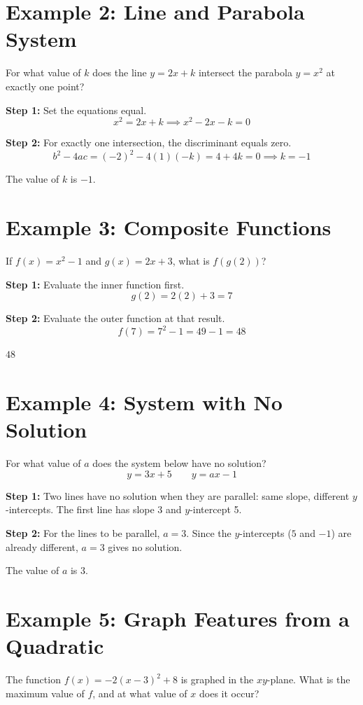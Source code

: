 \documentclass[14pt]{extarticle}
\begin{document}
\section*{Example 2: Line and Parabola System}

For what value of \(k\) does the line \(y = 2x + k\) intersect the parabola \(y = x^2\) at exactly one point?

\textbf{Step 1:} Set the equations equal.
\[
x^2 = 2x + k \implies x^2 - 2x - k = 0
\]

\textbf{Step 2:} For exactly one intersection, the discriminant equals zero.
\[
b^2 - 4ac = (-2)^2 - 4(1)(-k) = 4 + 4k = 0 \implies k = -1
\]

The value of \(k\) is \(\boxed{-1}\).

\section*{Example 3: Composite Functions}

If \(f(x) = x^2 - 1\) and \(g(x) = 2x + 3\), what is \(f(g(2))\)?

\textbf{Step 1:} Evaluate the inner function first.
\[
g(2) = 2(2) + 3 = 7
\]

\textbf{Step 2:} Evaluate the outer function at that result.
\[
f(7) = 7^2 - 1 = 49 - 1 = 48
\]

\(\boxed{48}\)

\section*{Example 4: System with No Solution}

For what value of \(a\) does the system below have no solution?
\[
y = 3x + 5 \qquad y = ax - 1
\]

\textbf{Step 1:} Two lines have no solution when they are parallel: same slope, different \(y\)-intercepts. The first line has slope 3 and \(y\)-intercept 5.

\textbf{Step 2:} For the lines to be parallel, \(a = 3\). Since the \(y\)-intercepts (\(5\) and \(-1\)) are already different, \(a = 3\) gives no solution.

The value of \(a\) is \(\boxed{3}\).

\section*{Example 5: Graph Features from a Quadratic}

The function \(f(x) = -2(x - 3)^2 + 8\) is graphed in the \(xy\)-plane. What is the maximum value of \(f\), and at what value of \(x\) does it occur?
\end{document}
